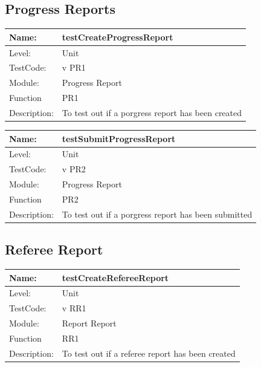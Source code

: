 \documentclass[12pt]{article}
\begin{document}
\subsection{Progress Reports}
\begin{center}
\begin{tabular}{|l|p{12cm}|}
\hline

 Name: & testCreateProgressReport \\
\hline
Level: & Unit \\
\hline
TestCode: & v PR1 \\
\hline
Module:& Progress Report\\
\hline
Function & PR1 \\
\hline
Description: & To test out if a porgress report has been created \\
\hline

\end{tabular}
\end{center}

\begin{center}
\begin{tabular}{|l|p{12cm}|}
\hline

 Name: & testSubmitProgressReport \\
\hline
Level: & Unit \\
\hline
TestCode: & v PR2 \\
\hline
Module:& Progress Report\\
\hline
Function & PR2 \\
\hline
Description: & To test out if a porgress report has been submitted \\
\hline

\end{tabular}
\end{center}

\subsection{Referee Report}
\begin{center}
\begin{tabular}{|l|p{12cm}|}
\hline

 Name: & testCreateRefereeReport \\
\hline
Level: & Unit \\
\hline
TestCode: & v RR1 \\
\hline
Module:& Report Report\\
\hline
Function & RR1 \\
\hline
Description: & To test out if a referee report has been created \\
\hline

\end{tabular}
\end{center}
\end{document}

